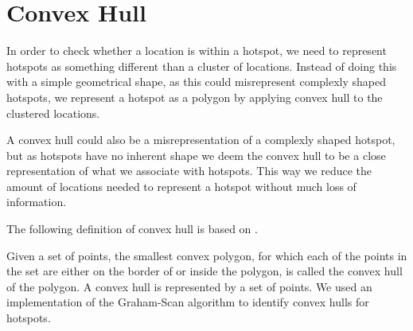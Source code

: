 \section{Convex Hull}\label{convex_hull}
In order to check whether a location is within a hotspot, we need to represent hotspots as something different than a cluster of locations.
Instead of doing this with a simple geometrical shape, as this could misrepresent complexly shaped hotspots, we represent a hotspot as a polygon by applying convex hull to the clustered locations.

A convex hull could also be a misrepresentation of a complexly shaped hotspot, but as hotspots have no inherent shape we deem the convex hull to be a close representation of what we associate with hotspots.
This way we reduce the amount of locations needed to represent a hotspot without much loss of information.

The following definition of convex hull is based on \citet[section 33.3]{aadbook}.

Given a set of points, the smallest convex polygon, for which each of the points in the set are either on the border of or inside the polygon, is called the convex hull of the polygon\cite[33.1-5]{aadbook}.
A convex hull is represented by a set of points.
We used an implementation of the Graham-Scan\cite[page 1031]{aadbook} algorithm to identify convex hulls for hotspots.
